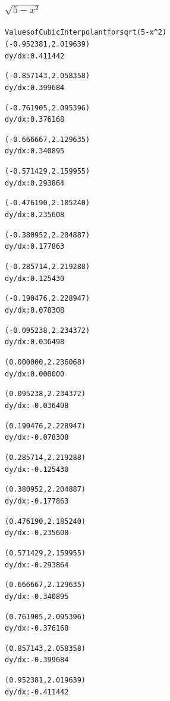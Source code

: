 \documentclass[11pt]{article} %
\begin{document}
\subsubsection*{$\sqrt{5-x^2}$}
\begin{alltt}
 Values of Cubic Interpolant for sqrt(5-x^2)
(-0.952381, 2.019639)
 dy/dx:	0.411442

(-0.857143, 2.058358)
 dy/dx:	0.399684

(-0.761905, 2.095396)
 dy/dx:	0.376168

(-0.666667, 2.129635)
 dy/dx:	0.340895

(-0.571429, 2.159955)
 dy/dx:	0.293864

(-0.476190, 2.185240)
 dy/dx:	0.235608

(-0.380952, 2.204887)
 dy/dx:	0.177863

(-0.285714, 2.219288)
 dy/dx:	0.125430

(-0.190476, 2.228947)
 dy/dx:	0.078308

(-0.095238, 2.234372)
 dy/dx:	0.036498

(0.000000, 2.236068)
 dy/dx:	0.000000

(0.095238, 2.234372)
 dy/dx:	-0.036498

(0.190476, 2.228947)
 dy/dx:	-0.078308

(0.285714, 2.219288)
 dy/dx:	-0.125430

(0.380952, 2.204887)
 dy/dx:	-0.177863

(0.476190, 2.185240)
 dy/dx:	-0.235608

(0.571429, 2.159955)
 dy/dx:	-0.293864

(0.666667, 2.129635)
 dy/dx:	-0.340895

(0.761905, 2.095396)
 dy/dx:	-0.376168

(0.857143, 2.058358)
 dy/dx:	-0.399684

(0.952381, 2.019639)
 dy/dx:	-0.411442

\end{alltt}
\end{document}
